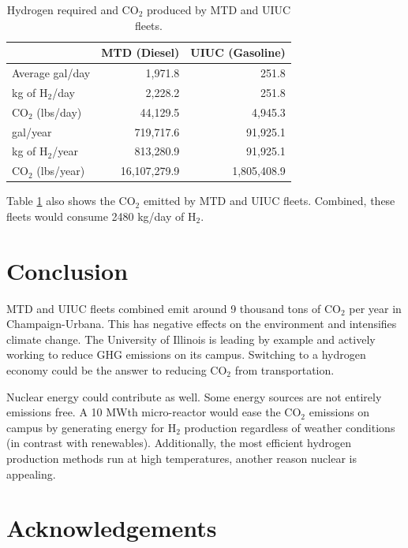 \documentclass{anstrans}
\begin{document}
\begin{table}[H]
	\centering
    \caption{Hydrogen required and CO$_2$ produced by MTD and UIUC fleets.}
    \label{tab:h2req}
\begin{tabular}{l|rr}
\hline
                   & MTD (Diesel)   & UIUC (Gasoline)  \\ \hline
Average gal/day    & 1,971.8        & 251.8            \\
kg of H$_2$/day    & 2,228.2        & 251.8            \\
CO$_2$ (lbs/day)   & 44,129.5       & 4,945.3          \\
gal/year           & 719,717.6      & 91,925.1         \\
kg of H$_2$/year   & 813,280.9      & 91,925.1         \\
CO$_2$ (lbs/year)  & 16,107,279.9   & 1,805,408.9      \\ \hline
\end{tabular}
\end{table}

Table \ref{tab:h2req} also shows the CO$_2$ emitted by MTD and UIUC fleets.
Combined, these fleets would consume 2480 kg/day of H$_2$. 

\section{Conclusion}

MTD and UIUC fleets combined emit around 9 thousand tons of CO$_2$ per year in Champaign-Urbana. This has negative effects on the environment and intensifies climate change. The University of Illinois is leading by example and actively working to reduce GHG emissions on its campus. Switching to a hydrogen economy could be the answer to reducing CO$_2$ from transportation.

Nuclear energy could contribute as well. Some energy sources are not entirely emissions free. A 10 MWth micro-reactor would ease the CO$_2$ emissions on campus by generating energy for H$_2$ production regardless of weather conditions (in contrast with renewables). Additionally, the most efficient hydrogen production methods run at high temperatures, another reason nuclear is appealing.

\section{Acknowledgements}
\end{document}
